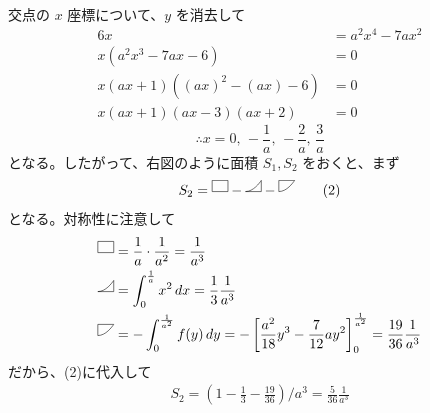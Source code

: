 \documentclass[../main.tex]{subfiles}
\begin{document}
\noindent
交点の $x$ 座標について、$y$ を消去して
\begin{align*}
  6x &= a^2 x^4 - 7ax^2 \\
  x(a^2 x^3 - 7ax - 6) &= 0 \\
  x(ax + 1)((ax)^2 - (ax) - 6) &= 0 \\
  x(ax + 1)(ax - 3)(ax + 2) &= 0
\end{align*}
\[
  \therefore x = 0, \, -\frac{1}{a}, \, -\frac{2}{a}, \, \frac{3}{a}
\]
となる。したがって、右図のように面積 $S_1, S_2$ をおくと、まず
\begin{align}
  S_2 =
  \begin{tikzpicture}[scale=0.4, baseline=-0.5ex]
    \draw (0,0) rectangle (1,0.7);
  \end{tikzpicture}
  -
  \begin{tikzpicture}[scale=0.4, baseline=-0.5ex]
    \draw (0,0) -- (1,0) -- (1,0.7);
    \draw (0,0) parabola (1,0.7);
  \end{tikzpicture}
  -
  \begin{tikzpicture}[scale=0.4, baseline=-0.5ex]
    \draw (0,0) -- (0,0.7) -- (1,0.7);
    \draw (0,0) parabola (1,0.7);
  \end{tikzpicture}
  \tag{2}
\end{align}
となる。対称性に注意して
\begin{align*}
  \begin{tikzpicture}[scale=0.4, baseline=-0.5ex]
    \draw (0,0) rectangle (1,0.7);
  \end{tikzpicture}
  &= \frac{1}{a} \cdot \frac{1}{a^2} = \frac{1}{a^3} \\
  \begin{tikzpicture}[scale=0.4, baseline=-0.5ex]
    \draw (0,0) -- (1,0) -- (1,0.7);
    \draw (0,0) parabola (1,0.7);
  \end{tikzpicture}
  &= \int_0^{\frac{1}{a}} x^2 \, dx = \frac{1}{3}\frac{1}{a^3} \\
  \begin{tikzpicture}[scale=0.4, baseline=-0.5ex]
    \draw (0,0) -- (0,0.7) -- (1,0.7);
    \draw (0,0) parabola (1,0.7);
  \end{tikzpicture}
  &= -\int_0^{\frac{1}{a^2}} f(y) \, dy = -\left[ \frac{a^2}{18}y^3 - \frac{7}{12}ay^2 \right]_0^{\frac{1}{a^2}} = \frac{19}{36}\frac{1}{a^3}
\end{align*}
だから、(2)に代入して
\begin{align}
  S_2 = \left( 1 - \frac{1}{3} - \frac{19}{36} \right) / a^3 = \frac{5}{36}\frac{1}{a^3} \tag{3}
\end{align}
\end{document}
